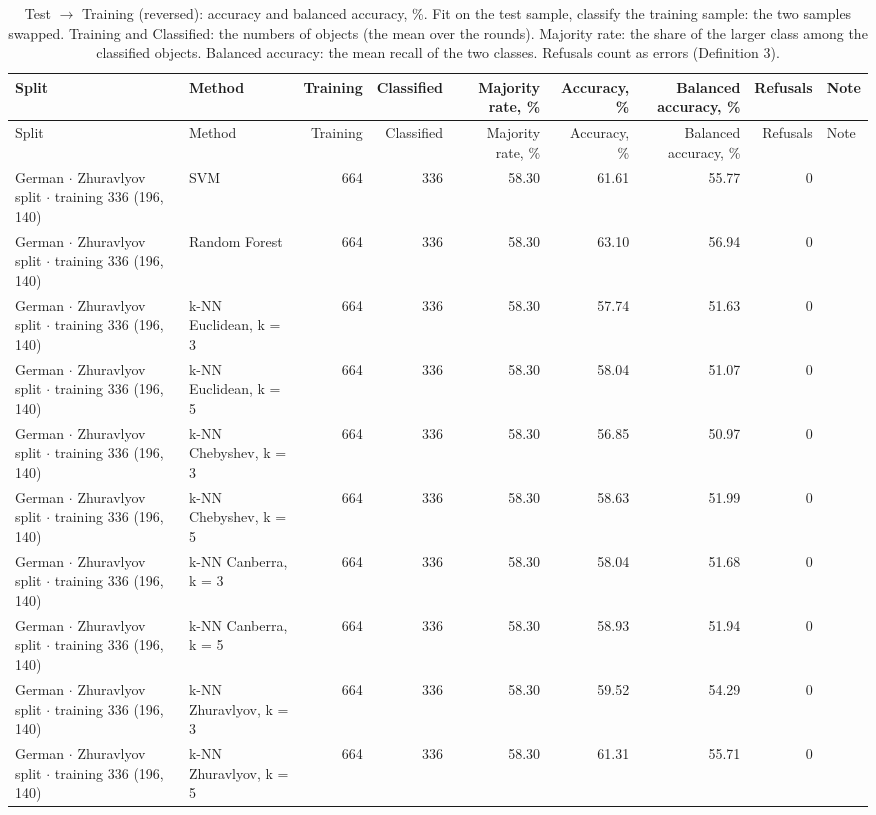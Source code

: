 \begin{longtable}{llrrrrrrl}
  \caption{Test $\to$ Training (reversed): accuracy and balanced accuracy, \%. Fit on the test sample, classify the training sample: the two samples swapped. Training and Classified: the numbers of objects (the mean over the rounds). Majority rate: the share of the larger class among the classified objects. Balanced accuracy: the mean recall of the two classes. Refusals count as errors (Definition 3).}\label{tab:reversed} \\
  \toprule
  Split & Method & Training & Classified & Majority rate, \% & Accuracy, \% & Balanced accuracy, \% & Refusals & Note \\
  \midrule
  \endfirsthead
  \toprule
  Split & Method & Training & Classified & Majority rate, \% & Accuracy, \% & Balanced accuracy, \% & Refusals & Note \\
  \midrule
  \endhead
  \bottomrule
  \endfoot
  German $\cdot$ Zhuravlyov split $\cdot$ training 336 (196, 140) & SVM & 664 & 336 & 58.30 & 61.61 & 55.77 & 0 &  \\
  German $\cdot$ Zhuravlyov split $\cdot$ training 336 (196, 140) & Random Forest & 664 & 336 & 58.30 & 63.10 & 56.94 & 0 &  \\
  German $\cdot$ Zhuravlyov split $\cdot$ training 336 (196, 140) & k-NN Euclidean, k = 3 & 664 & 336 & 58.30 & 57.74 & 51.63 & 0 &  \\
  German $\cdot$ Zhuravlyov split $\cdot$ training 336 (196, 140) & k-NN Euclidean, k = 5 & 664 & 336 & 58.30 & 58.04 & 51.07 & 0 &  \\
  German $\cdot$ Zhuravlyov split $\cdot$ training 336 (196, 140) & k-NN Chebyshev, k = 3 & 664 & 336 & 58.30 & 56.85 & 50.97 & 0 &  \\
  German $\cdot$ Zhuravlyov split $\cdot$ training 336 (196, 140) & k-NN Chebyshev, k = 5 & 664 & 336 & 58.30 & 58.63 & 51.99 & 0 &  \\
  German $\cdot$ Zhuravlyov split $\cdot$ training 336 (196, 140) & k-NN Canberra, k = 3 & 664 & 336 & 58.30 & 58.04 & 51.68 & 0 &  \\
  German $\cdot$ Zhuravlyov split $\cdot$ training 336 (196, 140) & k-NN Canberra, k = 5 & 664 & 336 & 58.30 & 58.93 & 51.94 & 0 &  \\
  German $\cdot$ Zhuravlyov split $\cdot$ training 336 (196, 140) & k-NN Zhuravlyov, k = 3 & 664 & 336 & 58.30 & 59.52 & 54.29 & 0 &  \\
  German $\cdot$ Zhuravlyov split $\cdot$ training 336 (196, 140) & k-NN Zhuravlyov, k = 5 & 664 & 336 & 58.30 & 61.31 & 55.71 & 0 &  \\

\end{longtable}
